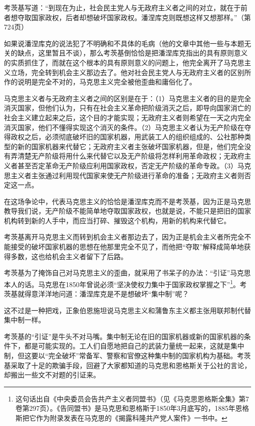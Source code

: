 \documentclass[UTF8, 12pt, a4paper]{ctexrep}
\begin{document}
考茨基写道：“到现在为止，社会民主党人与无政府主义者之间的对立，就在于前者想夺取国家政权，后者却想破坏国家政权。潘涅库克则既想这样又想那样。”（第724页）

如果说潘涅库克的说法犯了不明确和不具体的毛病（他的文章中其他一些与本题无关的缺点，这里暂且不谈），那么考茨基倒恰恰是把潘涅库克指出的具有原则意义的实质抓住了，而就在这个根本的具有原则意义的问题上，他完全离开了马克思主义立场，完全转到机会主义那边去了。他对社会民主党人与无政府主义者的区别所作的说明是完全不对的，马克思主义完全被他歪曲和庸俗化了。

马克思主义者与无政府主义者之间的区别是在于：（1）马克思主义者的目的是完全消灭国家，但他们认为，只有在社会主义革命把阶级消灭之后，即导向国家消亡的社会主义建立起来之后，这个目的才能实现；无政府主义者则希望在一天之内完全消灭国家，他们不懂得实现这个消灭的条件。（2）马克思主义者认为无产阶级在夺得政权之后，必须彻底破坏旧的国家机器，用武装工人的组织组成的、公社那种类型的新的国家机器来代替它；无政府主义者主张破坏国家机器，但是，他们完全没有弄清楚无产阶级将用什么来代替它以及无产阶级将怎样利用革命政权；无政府主义者甚至否定革命无产阶级应利用国家政权，否定无产阶级的革命专政。（3）马克思主义者主张通过利用现代国家来使无产阶级进行革命的准备；无政府主义者则否定这一点。

在这场争论中，代表马克思主义的恰恰是潘涅库克而不是考茨基，因为正是马克思教导我们说，无产阶级不能简单地夺取国家政权，也就是说，不能只是把旧的国家机构转到新的人手中，而应当打碎、摧毁这个机构，用新的机构来代替它。

考茨基离开马克思主义而转到机会主义者那边去了，因为正是机会主义者所完全不能接受的破坏国家机器的思想在他那里完全不见了，而他把“夺取”解释成简单地获得多数，这也给机会主义者留下了后路。

考茨基为了掩饰自己对马克思主义的歪曲，就采用了书呆子的办法：“引证”马克思本人的话。马克思在1850年曾说必须“坚决使权力集中于国家政权掌握之下”\footnote{这句话出自《中央委员会告共产主义者同盟书》（见《马克思恩格斯全集》第7卷第297页）。《告同盟书》是马克思和恩格斯于1850年3月底写的，1885年恩格斯把它作为附录发表在马克思的《揭露科隆共产党人案件》一书中。}。考茨基就得意洋洋地问道：潘涅库克是不是想破坏“集中制”呢？

这不过是一种把戏，正象伯恩施坦说马克思主义和蒲鲁东主义都主张用联邦制代替集中制一样。

考茨基的“引证”是牛头不对马嘴。集中制无论在旧的国家机器或新的国家机器的条件下，都是可能实现的。工人们自愿地把自己的武装力量统一起来，这就是集中制，但这要以“完全破坏”常备军、警察和官僚这种集中制的国家机构为基础。考茨基采取了十足的欺骗手段，回避了大家都知道的马克思和恩格斯关于公社的言论，却搬出一些文不对题的引证来。
\end{document}
